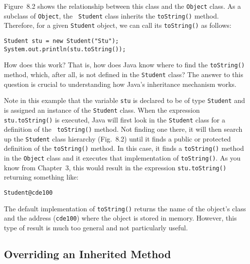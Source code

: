 \noindent Figure~8.2 shows the relationship between this class
and the {\tt Object} class.  As a subclass of {\tt Object}, the {\tt
Student} class inherits the {\tt toString()} method. Therefore, for a
given {\tt Student} object, we can call its {\tt toString()} as
follows:

\begin{jjjlisting}
\begin{lstlisting}
Student stu = new Student("Stu");
System.out.println(stu.toString());
\end{lstlisting}
\end{jjjlisting}

\noindent How does this work? That is, how does Java know where to
find the {\tt toString()} method, which, after all, is not defined in
the {\tt Student} class?  The answer to this question is crucial to
understanding how Java's inheritance mechanism works.  

Note in this example that the variable {\tt stu} is declared to be of
type {\tt Student} and is assigned an instance of the {\tt Student}
class. When the expression {\tt stu.toString()} is executed, Java will
first look in the {\tt Student} class for a definition of the {\tt
toString()} method. Not finding one there, it will then search up the
{\tt Student} class hierarchy (Fig.~8.2) until it finds a public or
protected definition of the {\tt toString()} method. In this case, it
finds a {\tt toString()} method in the {\tt Object} class and it
executes that implementation of {\tt toString()}.  As you know from
Chapter~3, this would result in the expression {\tt stu.toString()}
returning something like:

\begin{jjjlisting}
\begin{lstlisting}
Student@cde100
\end{lstlisting}
\end{jjjlisting}

\noindent The default implementation of {\tt toString()} returns the
name of the object's class and the address ({\tt cde100}) where the
object is stored in memory. However, this type of result is much too
general and not particularly useful.

\subsection{Overriding an Inherited Method}

